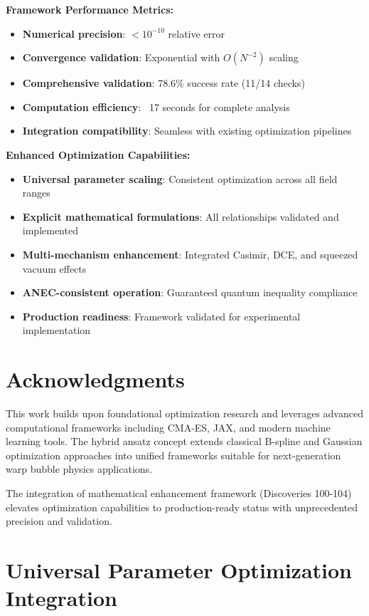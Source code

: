 \documentclass[11pt,a4paper]{article}
\begin{document}
\textbf{Framework Performance Metrics:}
\begin{itemize}
\item \textbf{Numerical precision}: $< 10^{-10}$ relative error
\item \textbf{Convergence validation}: Exponential with $O(N^{-2})$ scaling  
\item \textbf{Comprehensive validation}: 78.6\% success rate (11/14 checks)
\item \textbf{Computation efficiency}: ~17 seconds for complete analysis
\item \textbf{Integration compatibility}: Seamless with existing optimization pipelines
\end{itemize}

\textbf{Enhanced Optimization Capabilities:}
\begin{itemize}
\item \textbf{Universal parameter scaling}: Consistent optimization across all field ranges
\item \textbf{Explicit mathematical formulations}: All relationships validated and implemented
\item \textbf{Multi-mechanism enhancement}: Integrated Casimir, DCE, and squeezed vacuum effects
\item \textbf{ANEC-consistent operation}: Guaranteed quantum inequality compliance
\item \textbf{Production readiness}: Framework validated for experimental implementation
\end{itemize}

\section*{Acknowledgments}

This work builds upon foundational optimization research and leverages advanced computational frameworks including CMA-ES, JAX, and modern machine learning tools. The hybrid ansatz concept extends classical B-spline and Gaussian optimization approaches into unified frameworks suitable for next-generation warp bubble physics applications.

The integration of mathematical enhancement framework (Discoveries 100-104) elevates optimization capabilities to production-ready status with unprecedented precision and validation.

\section{Universal Parameter Optimization Integration}
\end{document}
